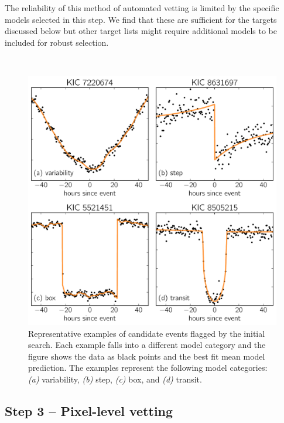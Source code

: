 \documentclass[manuscript, letterpaper]{aastex6}
\newcommand{\dfmfiglabel}[1]{\label{fig:#1}}
\begin{document}
The reliability of this method of automated vetting is limited by the specific
models selected in this step.
We find that these are sufficient for the targets discussed below but other
target lists might require additional models to be included for robust
selection.

\begin{figure}[p]~\\
\begin{center}
\includegraphics[width=\textwidth]{figures/model_comp.pdf}
\end{center}
\caption{%
Representative examples of candidate events flagged by the initial search.
Each example falls into a different model category and the figure shows the
data as black points and the best fit mean model prediction.
The examples represent the following model categories:
\emph{(a)} variability, \emph{(b)} step, \emph{(c)} box, and \emph{(d)}
transit.
\dfmfiglabel{model-comp}}
\end{figure}


\subsection{Step 3 -- Pixel-level vetting}
\end{document}
